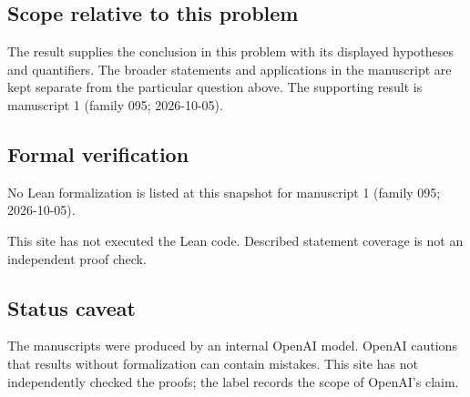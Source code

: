 \documentclass[11pt]{article}
\begin{document}
\subsection{Scope relative to this problem}
The result supplies the conclusion in this problem with its displayed hypotheses and quantifiers. The broader statements and applications in the manuscript are kept separate from the particular question above. The supporting result is manuscript 1 (family 095; 2026-10-05).

\subsection{Formal verification}
No Lean formalization is listed at this snapshot for manuscript 1 (family 095; 2026-10-05).

This site has not executed the Lean code. Described statement coverage is not an independent proof check.

\subsection{Status caveat}
The manuscripts were produced by an internal OpenAI model. OpenAI cautions that results without formalization can contain mistakes. This site has not independently checked the proofs; the label records the scope of OpenAI's claim.
\end{document}
